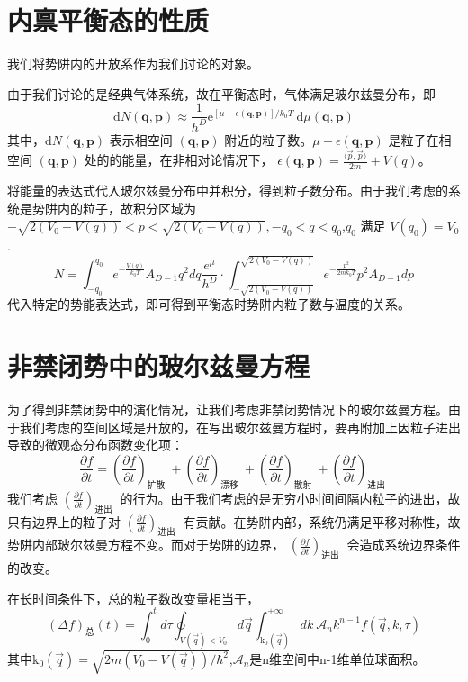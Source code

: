 \section{内禀平衡态的性质}
我们将势阱内的开放系作为我们讨论的对象。

由于我们讨论的是经典气体系统，故在平衡态时，气体满足玻尔兹曼分布，即
\begin{equation}\label{3.62}
  \mathrm{d} N(\boldsymbol{q}, \boldsymbol{p}) \approx \frac{1}{h^{D}} \mathrm{e}^{[\mu-\epsilon(\boldsymbol{q}, \boldsymbol{p})] / k_{0} T} \mathrm{~d} \mu(\boldsymbol{q}, \boldsymbol{p})
\end{equation}
其中，$\mathrm{d} N(\boldsymbol{q}, \boldsymbol{p})$  表示相空间  $(\boldsymbol{q}, \boldsymbol{p})$  附近的粒子数。$\mu-\epsilon(\boldsymbol{q}, \boldsymbol{p})$  是粒子在相空间  $(\boldsymbol{q}, \boldsymbol{p})$ 处的的能量，在非相对论情况下，  $\epsilon(\boldsymbol{q}, \boldsymbol{p})=\frac{\langle\vec{p}, \vec{p}\rangle}{2 m}+V(q)$。

将能量的表达式代入玻尔兹曼分布中并积分，得到粒子数分布。由于我们考虑的系统是势阱内的粒子，故积分区域为 $-\sqrt{2(V_{0}-V(q))}<p<\sqrt{2(V_{0}-V(q))},-q_{0}<q<q_{0}$,$q_{0}$  满足  $V(q_{0})=V_{0}$.
$$
N=\int_{-q_{0}}^{q_{0}} e^{-\frac{V(q)}{k_{0}T}}A_{D-1}q^{2} d q \frac{e^{\mu}}{h^{D}} \cdot \int_{-\sqrt{2\left(V_{0}-V(q)\right)}}^{\sqrt{2\left(V_{0}-V(q)\right)}} e^{-\frac{p^{2}}{2 m k_{0} T}} p^{2} A_{ D-1} dp
$$
代入特定的势能表达式，即可得到平衡态时势阱内粒子数与温度的关系。
\section{非禁闭势中的玻尔兹曼方程}
为了得到非禁闭势中的演化情况，让我们考虑非禁闭势情况下的玻尔兹曼方程。由于我们考虑的空间区域是开放的，在写出玻尔兹曼方程时，要再附加上因粒子进出导致的微观态分布函数变化项：
\begin{equation}
\frac{\partial f}{\partial t}=\left(\frac{\partial f}{\partial t}\right)_{\text {扩散 }}+\left(\frac{\partial f}{\partial t}\right)_{\text {漂移 }}+\left(\frac{\partial f}{\partial t}\right)_{\text {散射 }}+\left(\frac{\partial f}{\partial t}\right)_{\text {进出 }}
\end{equation}
我们考虑  $\left(\frac{\partial f}{\partial t}\right)_{\text {进出 }}$  的行为。由于我们考虑的是无穷小时间间隔内粒子的进出，故只有边界上的粒子对  $\left(\frac{\partial f}{\partial t}\right)_{\text {进出 }}$  有贡献。在势阱内部，系统仍满足平移对称性，故势阱内部玻尔兹曼方程不变。而对于势阱的边界，  $\left(\frac{\partial f}{\partial t}\right)_{\text {进出 }}$  会造成系统边界条件的改变。

在长时间条件下，总的粒子数改变量相当于，
\begin{equation}
  \left( \Delta f \right) _{\text{总}}\left( t \right) =\int_0^t{d\tau \oint_{V\left( \vec{q} \right) <V_0}{d\vec{q}\int_{\mathrm{k}_{0}\left( \vec{q} \right)}^{+\infty}{dk\ \mathcal{A}_nk^{n-1}f\left( \vec{q},k,\tau \right)}}}
\end{equation}
其中$\mathrm{k}_{0}(\vec{q}) = \sqrt{2m(V_0-V(\vec{q}))/\hbar^2}$,$\mathcal{A}_n$是n维空间中n-1维单位球面积。


